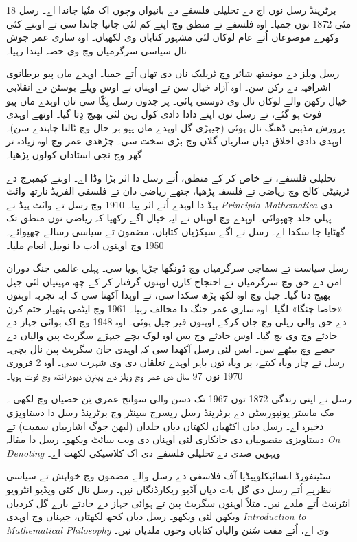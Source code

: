 \documentclass[../../../include/open-logic-section]{subfiles}
\begin{document}



برٹرینڈ رسل نوں اج دے تحلیلی فلسفے دے بانیواں وچوں اک منّیا جاندا اے۔ رسل 18 مئی 1872 نوں جمیا۔ اوہ فلسفے تے منطق وچ اپنے کم لئی جانیا جاندا سی تے اوہنے کئی وکھرے موضوعاں اُتے عام لوکاں لئی مشہور کتاباں وی لکھیاں۔ اوہ ساری عمر جوش نال سیاسی سرگرمیاں وچ وی حصہ لیندا رہیا۔

رسل ویلز دے مونمتھ شائر وچ ٹریلیک ناں دی تھاں اُتے جمیا۔ اوہدے ماں پیو برطانوی اشرافیہ دے رکن سن۔ اوہ آزاد خیال سن تے اوہناں نے اوس ویلے بوسٹن دے انقلابی خیال رکھن والے لوکاں نال وی دوستی پائی۔ پر جدوں رسل نِکّا سی تاں اوہدے ماں پیو فوت ہو گئے، تے رسل نوں اپنے دادا دادی کول رہن لئی بھیج دِتا گیا۔ اوتھے اوہدی پرورش مذہبی ڈھنگ نال ہوئی (جیہڑی گل اوہدے ماں پیو ہر حال وچ ٹالنا چاہندے سن)۔ اوہدی دادی اخلاق دیاں ساریاں گلاں وچ بڑی سخت سی۔ چڑھدی عمر وچ اوہ زیادہ تر گھر وچ نجی استاداں کولوں پڑھیا۔

تحلیلی فلسفے، تے خاص کر کے منطق، اُتے رسل دا اثر بڑا وڈا اے۔ اوہنے کیمبرج دے ٹرینیٹی کالج وچ ریاضی تے فلسفہ پڑھیا، جتھے ریاضی دان تے فلسفی الفریڈ نارتھ وائٹ ہیڈ دا اوہدے اُتے اثر پیا۔ 1910 وچ رسل تے وائٹ ہیڈ نے \emph{Principia Mathematica} دی پہلی جلد چھپوائی۔ اوہدے وچ اوہناں نے ایہ خیال اگے رکھیا کہ ریاضی نوں منطق تک گھٹایا جا سکدا اے۔ رسل نے اگے سیکڑیاں کتاباں، مضمون تے سیاسی رسالے چھپوائے۔ 1950 وچ اوہنوں ادب دا نوبیل انعام ملیا۔

رسل سیاست تے سماجی سرگرمیاں وچ ڈونگھا جڑیا ہویا سی۔ پہلی عالمی جنگ دوران امن دے حق وچ سرگرمیاں تے احتجاج کارن اوہنوں گرفتار کر کے چھ مہینیاں لئی جیل بھیج دتا گیا۔ جیل وچ اوہ لکھ پڑھ سکدا سی، تے اوہدا آکھنا سی کہ ایہ تجربہ اوہنوں «خاصا چنگا» لگیا۔ اوہ ساری عمر جنگ دا مخالف رہیا۔ 1961 وچ ایٹمی ہتھیار ختم کرن دے حق والی ریلی وچ جان کرکے اوہنوں فیر جیل ہوئی۔ اوہ 1948 وچ اک ہوائی جہاز دے حادثے وچ وی بچ گیا۔ اوس حادثے وچ بس اوہ لوک بچے جیہڑے سگریٹ پین والیاں دے حصے وچ بیٹھے سن۔ ایس لئی رسل آکھدا سی کہ اوہدی جان سگریٹ پین نال بچی۔ رسل نے چار ویاہ کیتے، پر ویاہ توں باہر اوہدے تعلقاں دی وی شہرت سی۔ اوہ 2 فروری 1970 نوں 97 سال دی عمر وچ ویلز دے پینرِن دیودرائتھ وچ فوت ہویا۔

\begin{reading}
رسل نے اپنی زندگی 1872 توں 1967 تک دسن والی سوانح عمری تِن حصیاں وچ لکھی \citep{Russell1967,Russell1968,Russell1969}۔ مک ماسٹر یونیورسٹی دے برٹرینڈ رسل ریسرچ سینٹر وچ برٹرینڈ رسل دا دستاویزی ذخیرہ اے۔ رسل دیاں اکٹھیاں لکھتاں دیاں جلداں (لبھن جوگ اشارییاں سمیت) تے دستاویزی منصوبیاں دی جانکاری لئی اوہناں دی ویب سائٹ \citet{Duncan2015} ویکھو۔ رسل دا مقالہ \emph{On
  Denoting} \citep{Russell1905} ویہویں صدی دے تحلیلی فلسفے دی اک کلاسیکی لکھت اے۔

سٹینفورڈ انسائیکلوپیڈیا آف فلاسفی دے رسل والے مضمون \citep{Irvine2015} وچ خواہش تے سیاسی نظریے اُتے رسل دی گل بات دیاں آڈیو ریکارڈنگاں نیں۔ رسل نال کئی ویڈیو انٹرویو انٹرنیٹ اُتے ملدے نیں۔ مثلاً اوہنوں سگریٹ پین تے ہوائی جہاز دے حادثے بارے گل کردیاں ویکھن لئی \citet{RussellND} ویکھو۔ رسل دیاں کجھ لکھتاں، جیہناں وچ اوہدی \emph{Introduction to Mathematical Philosophy} وی اے، \citet{LibriVoxND} اُتے مفت سُنن والیاں کتاباں وجوں ملدیاں نیں۔
\end{reading}
\end{document}
